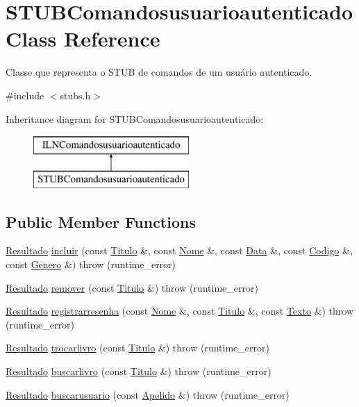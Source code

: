 \hypertarget{classSTUBComandosusuarioautenticado}{}\section{S\+T\+U\+B\+Comandosusuarioautenticado Class Reference}
\label{classSTUBComandosusuarioautenticado}


Classe que representa o S\+T\+UB de comandos de um usuário autenticado.  




{\ttfamily \#include $<$stubs.\+h$>$}

Inheritance diagram for S\+T\+U\+B\+Comandosusuarioautenticado\+:\begin{figure}[H]
\begin{center}
\leavevmode
\includegraphics[height=2.000000cm]{classSTUBComandosusuarioautenticado}
\end{center}
\end{figure}
\subsection*{Public Member Functions}
\begin{DoxyCompactItemize}
\item 
\hyperlink{classResultado}{Resultado} \hyperlink{classSTUBComandosusuarioautenticado_ac9e1818a8953c75e8c608f2eac526d4d}{incluir} (const \hyperlink{classTitulo}{Titulo} \&, const \hyperlink{classNome}{Nome} \&, const \hyperlink{classData}{Data} \&, const \hyperlink{classCodigo}{Codigo} \&, const \hyperlink{classGenero}{Genero} \&)  throw (runtime\+\_\+error)
\item 
\hyperlink{classResultado}{Resultado} \hyperlink{classSTUBComandosusuarioautenticado_a80c1a29ca48ebb60f6ba0d417946d595}{remover} (const \hyperlink{classTitulo}{Titulo} \&)  throw (runtime\+\_\+error)
\item 
\hyperlink{classResultado}{Resultado} \hyperlink{classSTUBComandosusuarioautenticado_a39e1508359209fe795a91817f0c96e20}{registrarresenha} (const \hyperlink{classNome}{Nome} \&, const \hyperlink{classTitulo}{Titulo} \&, const \hyperlink{classTexto}{Texto} \&)  throw (runtime\+\_\+error)
\item 
\hyperlink{classResultado}{Resultado} \hyperlink{classSTUBComandosusuarioautenticado_a435e243be205e8898efb085ff40aedc2}{trocarlivro} (const \hyperlink{classTitulo}{Titulo} \&)  throw (runtime\+\_\+error)
\item 
\hyperlink{classResultado}{Resultado} \hyperlink{classSTUBComandosusuarioautenticado_a12f684d2240412050e6eee54ebdd1a57}{buscarlivro} (const \hyperlink{classTitulo}{Titulo} \&)  throw (runtime\+\_\+error)
\item 
\hyperlink{classResultado}{Resultado} \hyperlink{classSTUBComandosusuarioautenticado_ad156d9cd3554e120bc8fff5916955465}{buscarusuario} (const \hyperlink{classApelido}{Apelido} \&)  throw (runtime\+\_\+error)
\end{DoxyCompactItemize}
